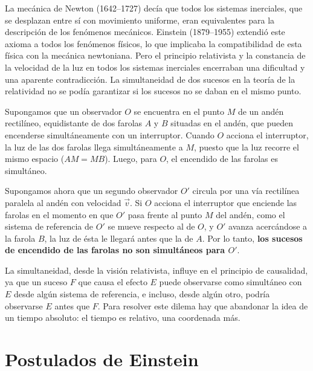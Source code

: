 La mecánica de Newton (1642--1727) decía que todos los sistemas
inerciales, que se desplazan entre sí con movimiento uniforme, eran
equivalentes para la descripción de los fenómenos mecánicos. Einstein
(1879--1955) extendió este axioma a todos los fenómenos físicos, lo que
implicaba la compatibilidad de esta física con la mecánica newtoniana.
Pero el principio relativista y la constancia de la velocidad de la luz
en todos los sistemas inerciales encerraban una dificultad y una
aparente contradicción. La simultaneidad de dos sucesos en la teoría de
la relatividad no se podía garantizar si los sucesos no se daban en el
mismo punto.

\begin{ejemplo}
Supongamos que un observador $O$ se encuentra en el punto $M$ de un
andén rectilíneo, equidistante de dos farolas $A$ y $B$ situadas en el
andén, que pueden encenderse simultáneamente con un interruptor. Cuando
$O$ acciona el interruptor, la luz de las dos farolas llega
simultáneamente a $M$, puesto que la luz recorre el mismo espacio
($AM=MB$). Luego, para $O$, el encendido de las farolas es simultáneo.

Supongamos ahora que un segundo observador $O'$ circula por una vía
rectilínea paralela al andén con velocidad $\vec v$. Si $O$ acciona el
interruptor que enciende las farolas en el momento en que $O'$ pasa
frente al punto $M$ del andén, como el sistema de referencia de $O'$ se
mueve respecto al de $O$, y $O'$ avanza acercándose a la farola $B$, la
luz de ésta le llegará antes que la de $A$. Por lo tanto, \textbf{los
sucesos de encendido de las farolas no son simultáneos para $O'$}.
\end{ejemplo}

\begin{observacion}
La simultaneidad, desde la visión relativista, influye en el principio
de causalidad, ya que un suceso $F$ que causa el efecto $E$ puede
observarse como simultáneo con $E$ desde algún sistema de referencia, e
incluso, desde algún otro, podría observarse $E$ antes que $F$. Para
resolver este dilema hay que abandonar la idea de un tiempo absoluto: el
tiempo es relativo, una coordenada más.
\end{observacion}

\section{Postulados de Einstein}

